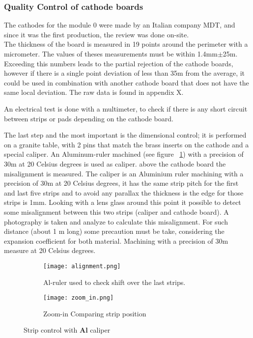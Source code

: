 \subsubsection{Quality Control of cathode boards}

The cathodes for the module 0 were made by an Italian company MDT, and since it was the first production, the review was
done on-site.\\
The thickness of the board is measured in 19 points around the perimeter with a micrometer. The
values of theses measurements must be within 1.4mm$\pm$25\micro m. Exceeding this numbers leads to the partial rejection
of the cathode boards, however if there is a single point deviation of less than 35\micro m from the average, it
could be used in combination with another cathode board that does not have the same local deviation. The raw data is
found in appendix X.\par An electrical test is done with a multimeter, to check if there is any short circuit between strips or
pads depending on the cathode board.\par
The last step and the most important is the dimensional control; it is performed on a granite table, with 2 pins that match the brass inserts
on the cathode and a special caliper. 
An Aluminum-ruler machined (see figure ~\ref{fig:ruler}) with a precision of 30\micro m at 20 Celsius
degrees is used as caliper.  above the cathode board the misalignment is measured. The caliper is an
Aluminium ruler machining  with a precision of 30\micro m at 20 Celsius degrees, it has the same strip pitch for the first
and last five strips and to avoid any parallax the thickness is the edge for those strips is 1mm. Looking with a lens
glass around this point it possible to detect some misalignment between this two strips (caliper and cathode board). A
photography is taken and analyze to calculate this misalignment. For such distance (about 1 m long) some precaution must
be take, considering the expansion coefficient for both material.  Machining with a precision of 30\micro m measure at 20
Celsius degrees.\par

\begin{figure}[ht]
	\centering
	\hspace*{\fill}
	{\begin{subfigure}[b]{0.35\textwidth}
		\texttt{[image: alignment.png]}
		\caption{Al-ruler used to check shift over the last strips.}
		\label{fig:ruler}
	\end{subfigure}
	}
	\hfill
	{\begin{subfigure}[b]{0.35\textwidth}
		\texttt{[image: zoom\_in.png]}
		\caption{Zoom-in Comparing strip position}
		\label{fig:zoom}
	\end{subfigure}
	}
	\hspace*{\fill}
	\caption{Strip control with {\bf Al} caliper}
\end{figure}

